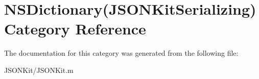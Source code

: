 \hypertarget{category_n_s_dictionary_07_j_s_o_n_kit_serializing_08}{\section{N\+S\+Dictionary(J\+S\+O\+N\+Kit\+Serializing) Category Reference}
\label{category_n_s_dictionary_07_j_s_o_n_kit_serializing_08}
}


The documentation for this category was generated from the following file\+:\begin{DoxyCompactItemize}
\item 
J\+S\+O\+N\+Kit/J\+S\+O\+N\+Kit.\+m\end{DoxyCompactItemize}
